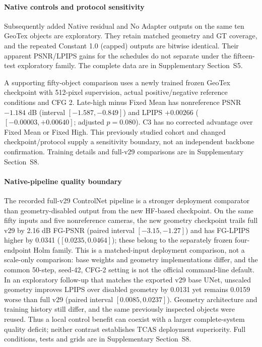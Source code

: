 \documentclass[times,twocolumn,final]{elsarticle}
\begin{document}
\paragraph{Native controls and protocol sensitivity}
Subsequently added Native residual and No Adapter outputs on the same ten GeoTex objects are exploratory. They retain matched geometry and GT coverage, and the repeated Constant 1.0 (capped) outputs are bitwise identical. Their apparent PSNR/LPIPS gains for the schedules do not separate under the fifteen-test exploratory family. The complete data are in Supplementary Section~S5.

A supporting fifty-object comparison uses a newly trained frozen GeoTex checkpoint with 512-pixel supervision, actual positive/negative reference conditions and CFG 2. Late-high minus Fixed Mean has nonreference PSNR $-1.184$ dB (interval $[-1.587,-0.849]$) and LPIPS $+0.00266$ ($[-0.00003,+0.00640]$; adjusted $p=0.080$). C3 has no corrected advantage over Fixed Mean or Fixed High. This previously studied cohort and changed checkpoint/protocol supply a sensitivity boundary, not an independent backbone confirmation. Training details and full-v29 comparisons are in Supplementary Section~S8.

\paragraph{Native-pipeline quality boundary}
The recorded full-v29 ControlNet pipeline is a stronger deployment comparator than geometry-disabled output from the new HF-based checkpoint. On the same fifty inputs and five nonreference cameras, the new geometry checkpoint trails full v29 by 2.16 dB FG-PSNR (paired interval $[-3.15,-1.27]$) and has FG-LPIPS higher by 0.0341 ($[0.0235,0.0464]$); these belong to the separately frozen four-endpoint Holm family. This is a matched-input deployment comparison, not a scale-only comparison: base weights and geometry implementations differ, and the common 50-step, seed-42, CFG-2 setting is not the official command-line default. In an exploratory follow-up that matches the exported v29 base UNet, unscaled geometry improves LPIPS over disabled geometry by 0.0131 yet remains 0.0159 worse than full v29 (paired interval $[0.0085,0.0237]$). Geometry architecture and training history still differ, and the same previously inspected objects were reused. Thus a local control benefit can coexist with a larger complete-system quality deficit; neither contrast establishes TCAS deployment superiority. Full conditions, tests and grids are in Supplementary Section~S8.
\end{document}
